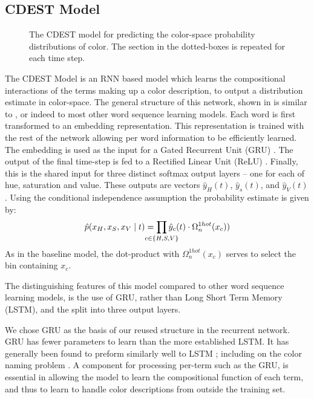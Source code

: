 \documentclass[11pt,a4paper]{article}
\newcommand{\parencite}{\citep}
\newcommand{\textcite}{\citet}
\begin{document}
\subsection{CDEST Model}

\begin{figure}
	\resizebox{\columnwidth}{!}{}
	
	\caption{\label{network}
		The CDEST model for predicting the color-space probability distributions of color.
		The section in the dotted-boxes is repeated for each time step.
	}
\end{figure}

The CDEST Model is an RNN based model which learns the compositional interactions of the terms making up a color description, to output a distribution estimate in color-space.
The general structure of this network, shown in  is similar to \textcite{2016arXiv160603821M}, or indeed to most other word sequence learning models.
Each word is first transformed to an embedding representation.
This representation is trained with the rest of the network allowing per word information to be efficiently learned.
The embedding is used as the input for a Gated Recurrent Unit (GRU)  \parencite{cho2014properties}.
The output of the final time-step is fed to a Rectified Linear Unit (ReLU)  \parencite{dahl2013reludropout}.
Finally, this is the shared input for three distinct softmax output layers -- one for each of hue, saturation and value.
These outputs are vectors $\hat{y}_{H}(t)$, $\hat{y}_{s}(t)$, and $\hat{y}_{V}(t)$.
Using the conditional independence assumption the probability estimate is given by:
\[
	\hat{p}(x_H,x_S,x_V\mid t) = \displaystyle\prod_{
		\mathclap{c\in {\{H,S,V\}}}}
	 \hat{y}_{c}(t)\cdot \Omega_{n}^{1hot}(x_c))
\]
As in the baseline model, the dot-product with $\Omega_{n}^{1hot}(x_c)$ serves to select the bin containing $x_c$.

The distinguishing features of this model compared to other word sequence learning models, is the use of GRU, rather than Long Short Term Memory (LSTM), and the split into three output layers.

We chose GRU as the basis of our reused structure in the recurrent network.
GRU has fewer parameters to learn than the more established LSTM.
It has generally been found to preform similarly well to LSTM \parencite{chung2014empirical};
including on the color naming problem \parencite{2016arXiv160603821M}.
A component for processing per-term such as the GRU, is essential in allowing the model to learn the compositional function of each term,  and thus to learn to handle color descriptions from outside the training set.
\end{document}
